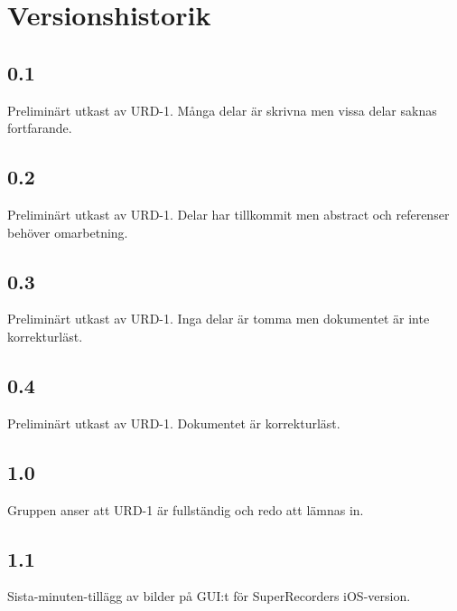 \section*{Versionshistorik}

\subsection*{0.1}
Preliminärt utkast av URD-1. Många delar är skrivna men vissa delar saknas fortfarande.

\subsection*{0.2}
Preliminärt utkast av URD-1. Delar har tillkommit men abstract och referenser behöver omarbetning.

\subsection*{0.3}
Preliminärt utkast av URD-1. Inga delar är tomma men dokumentet är inte korrekturläst.

\subsection*{0.4}
Preliminärt utkast av URD-1. Dokumentet är korrekturläst.

\subsection*{1.0}
Gruppen anser att URD-1 är fullständig och redo att lämnas in.

\subsection*{1.1}
Sista-minuten-tillägg av bilder på GUI:t för SuperRecorders iOS-version.
